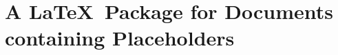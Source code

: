 \documentclass{scrartcl}
\begin{document}
\section*{A \LaTeX\ Package for Documents containing Placeholders}
\end{document}
